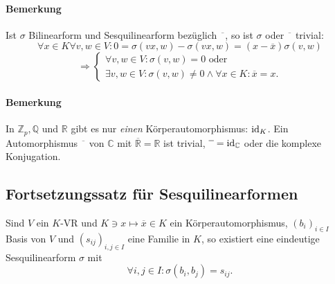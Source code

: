 \paragraph{Bemerkung}
	Ist $ \sigma $ Bilinearform und Sesquilinearform bezüglich $ \overline{\phantom{a}} $, so ist $ \sigma $ oder $ \overline{\phantom{a}} $ trivial:
		\[ \forall x\in K\forall v,w\in V: 0 = \sigma(vx,w) - \sigma(vx,w) = (x-\overline{x})\sigma(v,w)  \]
		\[ \Rightarrow \begin{cases}
		\forall v,w\in V: \sigma(v,w) = 0 \text{ oder}\\
		\exists v,w\in V: \sigma(v,w)\neq 0 \land \forall x\in K: \overline{x} = x.
		\end{cases} \]
\paragraph{Bemerkung}
	In $ \mathbb{Z}_p, \mathbb{Q} $ und $ \mathbb{R} $ gibt es nur \emph{einen} Körperautomorphismus: $ \operatorname{id}_K $. Ein Automorphismus $ \overline{\phantom{a}} $ von $ \mathbb{C} $ mit $ \overline{\mathbb{R}} = \mathbb{R} $ ist trivial, $ \overline{\phantom{a}} = \operatorname{id}_\mathbb{C} $ oder die komplexe Konjugation.
\subsection{Fortsetzungssatz für Sesquilinearformen}
\begin{Satz}
	Sind $ V $ ein $ K $-VR und $ K\ni x\mapsto \overline{x}\in K $ ein Körperautomorphismus, $ (b_i)_{i\in I} $ Basis von $ V $ und $ (s_{ij})_{i,j\in I} $ eine Familie in $ K $, so existiert eine eindeutige Sesquilinearform $ \sigma $ mit
		\[ \forall i,j\in I:\sigma(b_i,b_j) = s_{ij}. \]
\end{Satz}